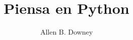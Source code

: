 \documentclass[10pt]{book}
\title{Piensa en Python}
\author{Allen B. Downey}
\newif\ifplastex
\begin{document}
\frontmatter

\ifplastex
    \usepackage{localdef}
    \maketitle

\newcount\anchorcnt
\newcommand*{\Anchor}[1]{%
  \@bsphack%
    \Hy@GlobalStepCount\anchorcnt%
    \edef\@currentHref{anchor.\the\anchorcnt}%
    \Hy@raisedlink{\hyper@anchorstart{\@currentHref}\hyper@anchorend}%
    \M@gettitle{}\label{#1}%
    \@esphack%
}


\else

\newtheorem{exercise}{Ejercicio}[chapter]



\end{document}
